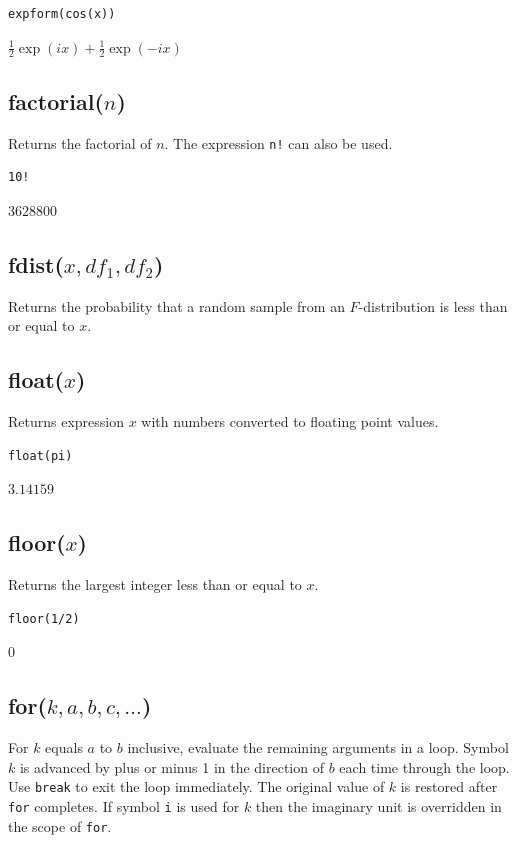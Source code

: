 {\color{blue}
\begin{verbatim}
expform(cos(x))
\end{verbatim}
}

$\tfrac{1}{2}\exp(ix)+\frac{1}{2}\exp(-ix)$

\subsection*{factorial($n$)}

Returns the factorial of $n$.
The expression \verb$n!$ can also be used.

{\color{blue}
\begin{verbatim}
10!
\end{verbatim}
}

$3628800$

\subsection*{fdist($x,df_1,df_2$)}

Returns the probability that a random sample from an $F$-distribution is less than or equal to $x$.

\subsection*{float($x$)}

Returns expression $x$ with numbers converted to floating point values.

{\color{blue}
\begin{verbatim}
float(pi)
\end{verbatim}
}

$3.14159$

\subsection*{floor($x$)}

Returns the largest integer less than or equal to $x$.

{\color{blue}
\begin{verbatim}
floor(1/2)
\end{verbatim}
}

$0$

\subsection*{for($k,a,b,c,\ldots$)}

For $k$ equals $a$ to $b$ inclusive, evaluate the remaining arguments in a loop.
Symbol $k$ is advanced by plus or minus 1 in the direction of $b$ each time through the loop.
Use \verb$break$ to exit the loop immediately.
The original value of $k$ is restored after \verb$for$ completes.
If symbol \verb$i$ is used for $k$ then the imaginary unit is overridden in the scope of \verb$for$.

